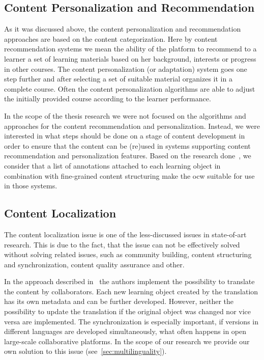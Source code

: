 \documentclass[PhD, Submit, ngerman,UKenglish,table]{scrbook}
\begin{document}
\subsection{Content Personalization and Recommendation}
\label{sec:content_personalization}

As it was discussed above, the content personalization and recommendation approaches are based on the content categorization.
Here by content recommendation systems we mean the ability of the platform to recommend to a learner a set of learning materials based on her background, interests or progress in other courses.
The content personalization (or adaptation) system goes one step further and after selecting a set of suitable material organizes it in a complete course.
Often the content personalization algorithms are able to adjust the initially provided course according to the learner performance.

In the scope of the thesis research we were not focused on the algorithms and approaches for the content recommendation and personalization.
Instead, we were interested in what steps should be done on a stage of content development in order to ensure that the content can be (re)used in systems supporting content recommendation and personalization features.
Based on the research done~\cite{Brooks2006, Ghali2009, Cabada2011}, we consider that a list of annotations attached to each learning object in combination with fine-grained content structuring make the \gls{ocw} suitable for use in those systems.



\subsection{Content Localization}

The content localization issue is one of the less-discussed issues in state-of-art research.
This is due to the fact, that the issue can not be effectively solved without solving related issues, such as community building, content structuring and synchronization, content quality assurance and other.

In the approach described in~\cite{Leinonen2010} the authors implement the possibility to translate the content by collaborators.
Each new learning object created by the translation has its own metadata and can be further developed.
However, neither the possibility to update the translation if the original object was changed nor vice versa are implemented.
The synchronization is especially important, if versions in different languages are developed simultaneously, what often happens in open large-scale collaborative platforms.
In the scope of our research we provide our own solution to this issue (see~\autoref{sec:multilinguality}).
\end{document}
